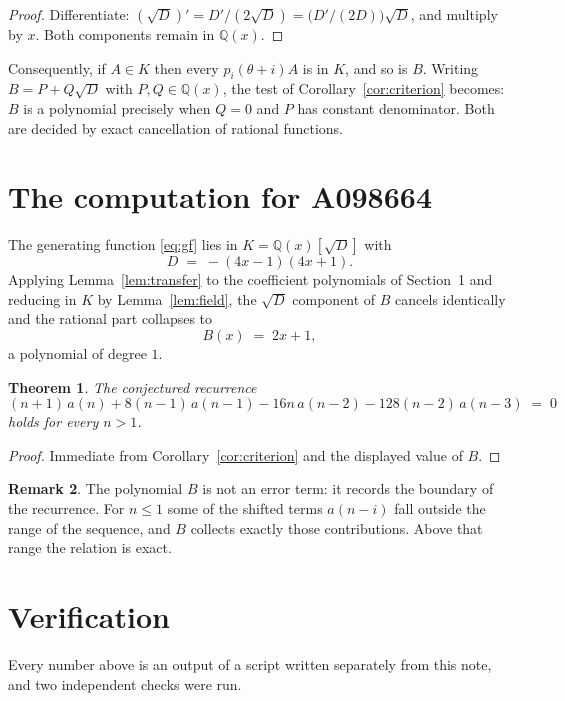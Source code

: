 \documentclass[11pt,a4paper]{article}
\theoremstyle{plain}
\newtheorem{theorem}{Theorem}
\theoremstyle{definition}
\newtheorem{remark}[theorem]{Remark}
\begin{document}
\begin{proof}
Differentiate: $(\sqrt{D})'=D'/(2\sqrt{D})=\bigl(D'/(2D)\bigr)\sqrt{D}$, and multiply by
$x$. Both components remain in $\mathbb{Q}(x)$.
\end{proof}

Consequently, if $A\in K$ then every $p_{i}(\theta+i)A$ is in $K$, and so is $B$. Writing
$B=P+Q\sqrt{D}$ with $P,Q\in\mathbb{Q}(x)$, the test of Corollary~\ref{cor:criterion}
becomes: $B$ is a polynomial precisely when $Q=0$ and $P$ has constant denominator. Both
are decided by exact cancellation of rational functions.

\section{The computation for A098664}

The generating function \eqref{eq:gf} lies in $K=\mathbb{Q}(x)[\sqrt{D}]$ with
\[
D \;=\; - \left(4 x - 1\right) \left(4 x + 1\right) .
\]
Applying Lemma~\ref{lem:transfer} to the coefficient polynomials of Section~1 and reducing
in $K$ by Lemma~\ref{lem:field}, the $\sqrt{D}$ component of $B$ cancels identically and
the rational part collapses to
\[
B(x)\;=\;2 x + 1 ,
\]
a polynomial of degree $1$.

\begin{theorem}
The conjectured recurrence
\[
(n + 1)\,a(n) + 8 \left(n - 1\right)\,a(n-1) -  16 n\,a(n-2) -  128 \left(n - 2\right)\,a(n-3) \;=\;0
\]
holds for every $n>1$.
\end{theorem}

\begin{proof}
Immediate from Corollary~\ref{cor:criterion} and the displayed value of $B$.
\end{proof}

\begin{remark}
The polynomial $B$ is not an error term: it records the boundary of the recurrence. For
$n\le1$ some of the shifted terms $a(n-i)$ fall outside the range of the sequence,
and $B$ collects exactly those contributions. Above that range the relation is exact.
\end{remark}

\section{Verification}

Every number above is an output of a script written separately from this note, and two
independent checks were run.
\end{document}
